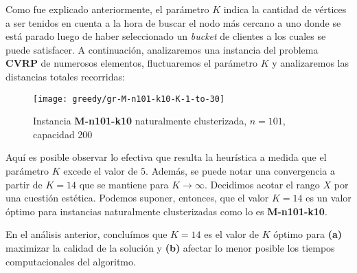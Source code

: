 Como fue explicado anteriormente, el parámetro $K$ indica la cantidad de vértices a ser tenidos en cuenta a la hora de buscar el nodo más cercano a uno donde se está parado luego de haber seleccionado un \textit{bucket} de clientes a los cuales se puede satisfacer. A continuación, analizaremos una instancia del problema \textbf{CVRP} de numerosos elementos, fluctuaremos el parámetro $K$ y analizaremos las distancias totales recorridas:

\begin{figure}[H]
	\centering
	\texttt{[image: greedy/gr-M-n101-k10-K-1-to-30]}
	\caption{\footnotesize Instancia \textbf{M-n101-k10} naturalmente clusterizada, $n=101$, capacidad 200}
	\label{fig:gr-M-n101-k10-K-1-to-30}
\end{figure}

Aquí es posible observar lo efectiva que resulta la heurística a medida que el parámetro $K$ excede el valor de $5$. Además, se puede notar una convergencia a partir de $K=14$ que se mantiene para $K \rightarrow \infty$. Decidimos acotar el rango $X$ por una cuestión estética. Podemos suponer, entonces, que el valor $K=14$ es un valor óptimo para instancias naturalmente clusterizadas como lo es \textbf{M-n101-k10}.

En el análisis anterior, concluímos que $K=14$ es el valor de $K$ óptimo para \textbf{(a)} maximizar la calidad de la solución y \textbf{(b)} afectar lo menor posible los tiempos computacionales del algoritmo.
